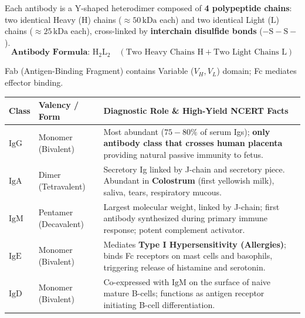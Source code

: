 \documentclass[10pt,a4paper]{article}
\begin{document}
\begin{formulabox}
Each antibody is a Y-shaped heterodimer composed of \textbf{4 polypeptide chains}: two identical Heavy ($\mathrm{H}$) chains ($\approx 50\,\mathrm{kDa}$ each) and two identical Light ($\mathrm{L}$) chains ($\approx 25\,\mathrm{kDa}$ each), cross-linked by \textbf{interchain disulfide bonds} ($\mathrm{-S-S-}$).
\begin{equation}
  \mathbf{\text{Antibody Formula: } \mathrm{H_2 L_2}} \quad (\text{Two Heavy Chains } \mathrm{H} + \text{Two Light Chains } \mathrm{L})
\end{equation}
\centerline{\small Fab (Antigen-Binding Fragment) contains Variable ($V_H, V_L$) domain; Fc mediates effector binding.}
\vspace{2pt}
\begin{center}
\scriptsize
\begin{tabular}{|p{1.2cm}|p{2.8cm}|p{10.6cm}|}
\hline
\textbf{Class} & \textbf{Valency / Form} & \textbf{Diagnostic Role \& High-Yield NCERT Facts} \\
\hline
$\mathbf{\mathrm{IgG}}$ & Monomer (Bivalent) & Most abundant ($75-80\%$ of serum Igs); \textbf{only antibody class that crosses human placenta} providing natural passive immunity to fetus. \\
\hline
$\mathbf{\mathrm{IgA}}$ & Dimer (Tetravalent) & Secretory Ig linked by J-chain and secretory piece. Abundant in \textbf{Colostrum} (first yellowish milk), saliva, tears, respiratory mucous. \\
\hline
$\mathbf{\mathrm{IgM}}$ & Pentamer (Decavalent) & Largest molecular weight, linked by J-chain; first antibody synthesized during primary immune response; potent complement activator. \\
\hline
$\mathbf{\mathrm{IgE}}$ & Monomer (Bivalent) & Mediates \textbf{Type I Hypersensitivity (Allergies)}; binds Fc receptors on mast cells and basophils, triggering release of histamine and serotonin. \\
\hline
$\mathbf{\mathrm{IgD}}$ & Monomer (Bivalent) & Co-expressed with $\mathrm{IgM}$ on the surface of naive mature B-cells; functions as antigen receptor initiating B-cell differentiation. \\
\hline
\end{tabular}
\end{center}
\end{formulabox}
\end{document}
